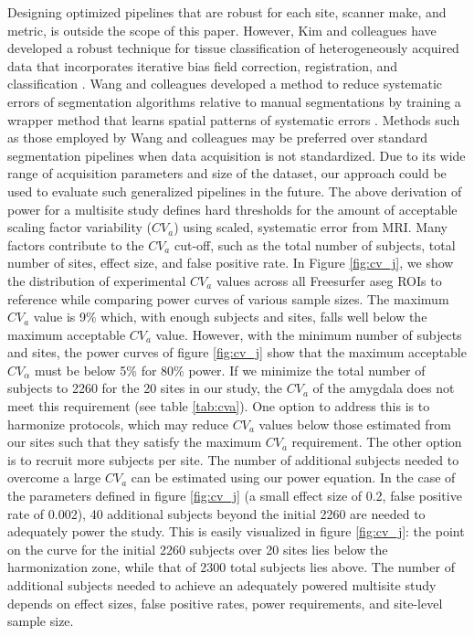 \documentclass{article}
\begin{document}
Designing optimized pipelines that are robust for each site, scanner make, and metric, is outside the scope of this paper. However, Kim and colleagues have developed a robust technique for tissue classification of heterogeneously acquired data that incorporates iterative bias field correction, registration, and classification \cite{optimize}. Wang and colleagues developed a method to reduce systematic errors of segmentation algorithms relative to manual segmentations by training a wrapper method that learns spatial patterns of systematic errors \cite{Wang2011}. Methods such as those employed by Wang and colleagues may be preferred over standard segmentation pipelines when data acquisition is not standardized. Due to its wide range of acquisition parameters and size of the dataset, our approach could be used to evaluate such generalized pipelines in the future.
The above derivation of power for a multisite study defines hard thresholds for the amount of acceptable scaling factor variability ($CV_{a}$) using scaled, systematic error from MRI. Many factors contribute to the $CV_{a}$ cut-off, such as the total number of subjects, total number of sites, effect size, and false positive rate. In Figure \ref{fig:cv_j}, we show the distribution of experimental $CV_{a}$ values across all Freesurfer aseg ROIs to reference while comparing power curves of various sample sizes. The maximum $CV_{a}$ value is 9\% which, with enough subjects and sites, falls well below the maximum acceptable $CV_{a}$ value. However, with the minimum number of subjects and sites, the power curves of figure \ref{fig:cv_j} show that the maximum acceptable $CV_{\alpha}$ must be below 5\% for 80\% power. If we minimize the total number of subjects to 2260 for the 20 sites in our study, the $CV_{a}$ of the amygdala does not meet this requirement (see table \ref{tab:cva}). One option to address this is to harmonize protocols, which may reduce $CV_a$ values below those estimated from our sites such that they satisfy the maximum $CV_{a}$ requirement. The other option is to recruit more subjects per site. The number of additional subjects needed to overcome a large $CV_a$ can be estimated using our power equation. In the case of the parameters defined in figure \ref{fig:cv_j} (a small effect size of 0.2, false positive rate of 0.002), 40 additional subjects beyond the initial 2260 are needed to adequately power the study. This is easily visualized in figure \ref{fig:cv_j}: the point on the curve for the initial 2260 subjects over 20 sites lies below the harmonization zone, while that of 2300 total subjects lies above. The number of additional subjects needed to achieve an adequately powered multisite study depends on effect sizes, false positive rates, power requirements, and site-level sample size. 
\end{document}

